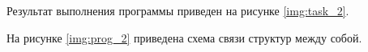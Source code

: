 Результат выполнения программы приведен на рисунке \ref{img:task_2}.
\begin{figure}[H]
\end{figure}

На рисунке \ref{img:prog_2} приведена схема связи структур между собой.
\begin{figure}[H]
\end{figure}

